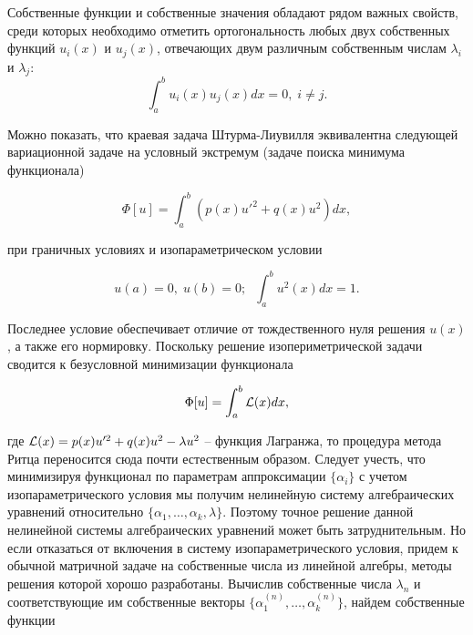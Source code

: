 \begin{info}
	Собственные функции и собственные значения обладают рядом важных свойств, среди которых необходимо отметить ортогональность любых двух собственных функций $u_{i}(x)$ и $u_{j}(x)$, отвечающих двум различным собственным числам $\lambda_{i}$ и $\lambda_{j}$:
	\begin{displaymath}
		\int_{a}^{b} u_{i}(x) u_{j}(x) dx = 0, \; i \neq j.
	\end{displaymath}
\end{info}

Можно показать, что краевая задача Штурма-Лиувилля эквивалентна следующей вариационной задаче на условный экстремум (задаче поиска минимума функционала)

\begin{displaymath}
	\Phi[u] = \int_{a}^{b} \left( p(x)u'^{2} + q(x)u^{2} \right) dx,
\end{displaymath}

\noindent при граничных условиях и изопараметрическом условии

\begin{displaymath}
	u(a) = 0, \; u(b) = 0; \; \; \int_{a}^{b} u^{2}(x)dx = 1.
\end{displaymath}

Последнее условие обеспечивает отличие от тождественного нуля решения $u(x)$, а также его нормировку. Поскольку решение изопериметрической задачи сводится к безусловной минимизации функционала

\begin{displaymath}
	\Phi[u] = \int_{a}^{b} \mathcal{L}(x) dx, 
\end{displaymath}

\noindent где $\mathcal{L}(x) = p(x)u'^{2} + q(x)u^{2} - \lambda u^{2}$ -- функция Лагранжа, то процедура метода Ритца переносится сюда почти естественным образом. Следует учесть, что минимизируя функционал по параметрам аппроксимации $\{\alpha_{i}\}$ с учетом изопараметрического условия мы получим нелинейную систему алгебраических уравнений относительно $\{\alpha_{1}, \dots, \alpha_{k}, \lambda\}$. Поэтому точное решение данной нелинейной системы алгебраических уравнений может быть затруднительным. Но если отказаться от включения в систему изопараметрического условия, придем к обычной матричной задаче на собственные числа из линейной алгебры, методы решения которой хорошо разработаны. Вычислив собственные числа $\lambda_{n}$ и соответствующие им собственные векторы $\{\alpha_{1}^{(n)}, \dots, \alpha_{k}^{(n)}\}$, найдем собственные функции


